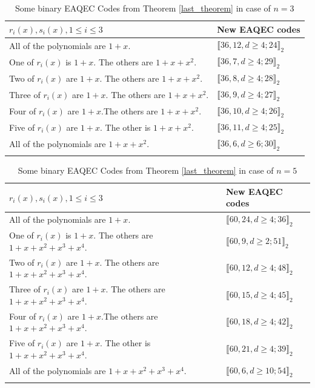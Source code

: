 \documentclass[pdflatex,sn-mathphys-num]{sn-jnl}%
\theoremstyle{thmstyleone}%
\theoremstyle{thmstyletwo}%
\theoremstyle{thmstylethree}%
\begin{document}
\begin{table}[!ht]
\caption{Some binary EAQEC Codes from Theorem \ref{last_theorem} in case of $n=3$}\label{n=3case}
 \begin{tabular}{@{}ll@{}}
 \toprule
 $r_i(x),s_i(x),1\leq i\leq 3$ & New EAQEC codes\\
 \midrule
 All of the polynomials are $1+x$. &  $\llbracket 36,12,d\geq 4;24\rrbracket_2$ \\
 One of $r_i(x)$ is $1+x$. The others are $1+x+x^2$. & $\llbracket 36,7,d\geq 4;29\rrbracket_2$ \\
 Two of $r_i(x)$ are $1+x$. The others are $1+x+x^2$. & $\llbracket 36,8,d\geq 4;28\rrbracket_2$ \\
 Three of $r_i(x)$ are $1+x$. The others are $1+x+x^2$. & $\llbracket 36,9,d\geq 4;27\rrbracket_2$ \\
 Four of $r_i(x)$ are $1+x$.The others are $1+x+x^2$. & $\llbracket 36,10,d\geq 4;26\rrbracket_2$ \\
 Five of $r_i(x)$ are $1+x$. The other is $1+x+x^2$. & $\llbracket 36,11,d\geq 4;25\rrbracket_2$ \\
  All of the polynomials are $1+x+x^2$. & $\llbracket 36,6,d\geq 6;30\rrbracket_2$ \\
 \botrule
 \end{tabular}
\end{table}

\begin{table}[!ht]
\caption{Some binary EAQEC Codes from Theorem \ref{last_theorem} in case of $n=5$}\label{n=5case}
 \begin{tabular}{@{}ll@{}}
 \toprule
 $r_i(x),s_i(x),1\leq i\leq 3$ & New EAQEC codes\\
 \midrule
 All of the polynomials are $1+x$. &  $\llbracket 60,24,d\geq 4;36\rrbracket_2$ \\
 One of $r_i(x)$ is $1+x$. The others are $1+x+x^2+x^3+x^4$. & $\llbracket 60,9,d\geq 2;51\rrbracket_2$ \\
 Two of $r_i(x)$ are $1+x$. The others are $1+x+x^2+x^3+x^4$. & $\llbracket 60,12,d\geq 4;48\rrbracket_2$ \\
 Three of $r_i(x)$ are $1+x$. The others are $1+x+x^2+x^3+x^4$. & $\llbracket 60,15,d\geq 4;45\rrbracket_2$ \\
 Four of $r_i(x)$ are $1+x$.The others are $1+x+x^2+x^3+x^4$. & $\llbracket 60,18,d\geq 4;42\rrbracket_2$ \\
 Five of $r_i(x)$ are $1+x$. The other is $1+x+x^2+x^3+x^4$. & $\llbracket 60,21,d\geq 4;39\rrbracket_2$ \\
  All of the polynomials are $1+x+x^2+x^3+x^4$. & $\llbracket 60,6,d\geq 10;54\rrbracket_2$ \\
 \botrule
 \end{tabular}
\end{table}
\end{document}

